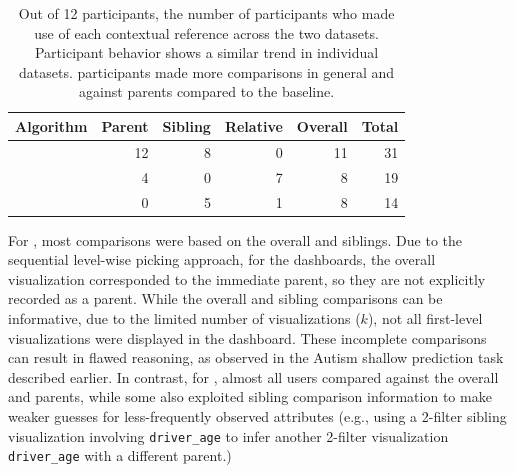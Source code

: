 \begin{table}[h!]
\hspace{-10pt}
\centering
	\begin{tabular}{|l|rrrr|r|}
	\hline
	 \small{Algorithm}   &    \small{Parent} &   \small{Sibling} &   \small{Relative} & \small{Overall} &   \small{Total} \\
	\hline
	 \small{\system}     &    \cellcolor{blue!25} 12 &       8 &     0 &  11 &      \cellcolor{blue!25} 31 \\
	 \small{\cluster}     &         4 &        0 &         7 &          8 &      19 \\
	 \small{\BFS}         &         0 &        5 &         1 &          8 &      14 \\
	\hline
	\end{tabular}
\caption{Out of 12 participants, the number of participants who made use of each contextual reference across the two datasets. Participant behavior shows a similar trend in individual datasets. \system participants made more comparisons in general and against parents compared to the baseline.}
\label{table:contextualReferenceCount}
\end{table}
\par For \BFS, most comparisons were based on the overall and siblings. Due to the sequential level-wise picking approach, for the \BFS dashboards, the overall visualization corresponded to the immediate parent, so they are not explicitly recorded as a parent. While the overall and sibling comparisons can be informative, due to the limited number of visualizations ($k$), not all first-level visualizations were displayed in the dashboard. These incomplete comparisons can result in flawed reasoning, as observed in the Autism shallow prediction task described earlier. In contrast, for \system, almost all users compared against the overall and parents, while some also exploited sibling comparison information to make weaker guesses for less-frequently observed attributes (e.g., using a 2-filter sibling visualization involving \texttt{driver\_age} to infer another 2-filter visualization \texttt{driver\_age} with a different parent.)
